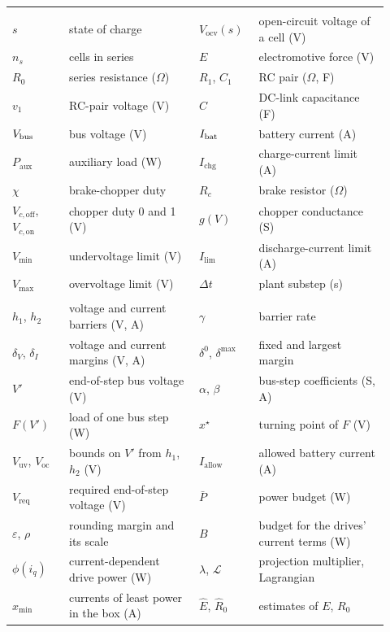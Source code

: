 {\begin{longtable}{@{}>{\raggedright\arraybackslash}p{0.14\linewidth}>{\raggedright\arraybackslash}p{0.32\linewidth}>{\raggedright\arraybackslash}p{0.14\linewidth}>{\raggedright\arraybackslash}p{0.32\linewidth}@{}}
\multicolumn{4}{@{}l}{\emph{Battery and bus}}\\
$s$ & state of charge & $V_{\mathrm{ocv}}(s)$ & open-circuit voltage of a cell (V) \\
$n_s$ & cells in series & $E$ & electromotive force (V) \\
$R_0$ & series resistance ($\Omega$) & $R_1$, $C_1$ & RC pair ($\Omega$, F) \\
$v_1$ & RC-pair voltage (V) & $C$ & DC-link capacitance (F) \\
$V_{\mathrm{bus}}$ & bus voltage (V) & $I_{\mathrm{bat}}$ & battery current (A) \\
$P_{\mathrm{aux}}$ & auxiliary load (W) & $I_{\mathrm{chg}}$ & charge-current limit (A) \\
$\chi$ & brake-chopper duty & $R_c$ & brake resistor ($\Omega$) \\
$V_{c,\mathrm{off}}$, $V_{c,\mathrm{on}}$ & chopper duty 0 and 1 (V) & $g(V)$ & chopper conductance (S) \\
$V_{\min}$ & undervoltage limit (V) & $I_{\lim}$ & discharge-current limit (A) \\
$V_{\max}$ & overvoltage limit (V) & $\Delta t$ & plant substep (s) \\[3pt]
\multicolumn{4}{@{}l}{\emph{Filter and estimator}}\\
$h_1$, $h_2$ & voltage and current barriers (V, A) & $\gamma$ & barrier rate \\
$\delta_V$, $\delta_I$ & voltage and current margins (V, A) & $\delta^0$, $\delta^{\max}$ & fixed and largest margin \\
$V'$ & end-of-step bus voltage (V) & $\alpha$, $\beta$ & bus-step coefficients (S, A) \\
$F(V')$ & load of one bus step (W) & $x^\star$ & turning point of $F$ (V) \\
$V_{\mathrm{uv}}$, $V_{\mathrm{oc}}$ & bounds on $V'$ from $h_1$, $h_2$ (V) & $I_{\mathrm{allow}}$ & allowed battery current (A) \\
$V_{\mathrm{req}}$ & required end-of-step voltage (V) & $\bar P$ & power budget (W) \\
$\varepsilon$, $\rho$ & rounding margin and its scale & $B$ & budget for the drives' current terms (W) \\
$\phi(i_q)$ & current-dependent drive power (W) & $\lambda$, $\mathcal L$ & projection multiplier, Lagrangian \\
$x_{\min}$ & currents of least power in the box (A) & $\hat E$, $\hat R_0$ & estimates of $E$, $R_0$ \\

\end{longtable}}
